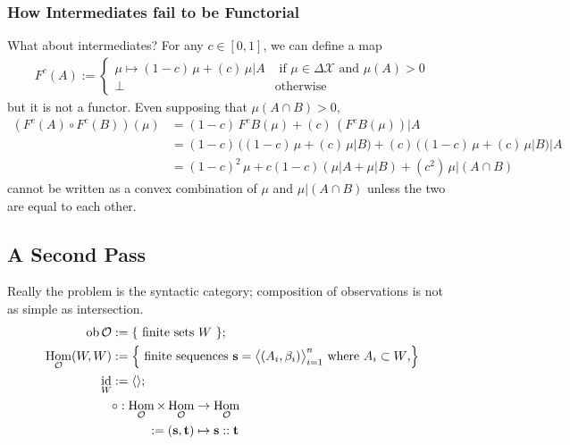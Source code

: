 \documentclass{article}
\DeclareMathOperator{\ob}{\mathrm{ob}}
\DeclareMathOperator{\id}{id}
\DeclareMathOperator{\Hom}{\mathrm{Hom}}
\newcommand\X{\mathcal{X}}
\newcommand\A{\mathcal{A}}
\newcommand\Ob{\mathcal{O}}
\begin{document}
    \subsubsection*{How Intermediates fail to be Functorial}
    What about intermediates?  For any $c \in [0,1]$, we can define a map
    \begin{align*}
        F^c(A
        ) := 
            \begin{cases}
                \mu \mapsto  (1-c)\, \mu + (c)\, \mu| A & \text{ if } \mu  \in \Delta\X \text{ and }\mu(A) > 0 \\
                \bot &\text{otherwise}                
        \end{cases}
    \end{align*}
    but it is not a functor. Even supposing that $\mu(A \cap B) > 0$, 
    \begin{align*}
        (F^c(A) \circ F^c(B))(\mu) 
            &= (1-c)\, F^c B(\mu) + (c)\,(F^c B(\mu))|A \\
            &= (1-c)\, \Big( (1-c)\, \mu + (c)\, \mu| B \Big) + (c)\, 
                \Big((1-c)\, \mu + (c)\, \mu| B\Big)|A \\
            &= (1-c)^2\,\mu + c(1-c) (\mu|A + \mu|B) + (c^2)\, \mu|(A \cap B)
    \end{align*}
    cannot be written as a convex combination of $\mu$ and $\mu|(A\cap B)$ unless the two are equal to each other. 
    
    \subsection{A Second Pass}
    Really the problem is the syntactic category; composition of observations is not as simple as intersection. 
    \begin{align*}
        \ob \Ob &:=  \{\text{ finite sets } W~\}; \\
        \Hom_{\Ob}(W,W) &:= 
            \Big\{ \text{ finite sequences $\mathbf s = \big\langle(A_i,\beta_i)\big\rangle_{i=1}^n$ where $A_i \subset W$,} \Big\} \\
        \id_{W} &:= \langle\rangle; \\
        &\begin{aligned}
        \circ : \Hom_{\Ob} \times \Hom_{\Ob} &\to \Hom_{\Ob} \\
            := ({\bf s, t}) &\mapsto {\bf s :: t}
        \end{aligned}
    \end{align*}
    
\end{document}
